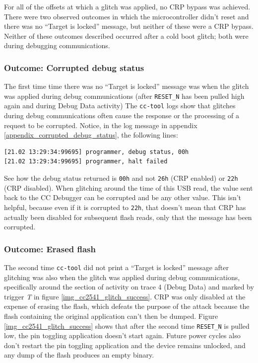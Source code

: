 For all of the offsets at which a glitch was applied, no CRP bypass was
achieved. There were two observed outcomes in which the microcontroller
didn't reset and there was no ``Target is locked'' message, but neither
of these were a CRP bypass. Neither of these outcomes described occurred
after a cold boot glitch; both were during debugging communications.

\hypertarget{outcome-corrupted-debug-status}{%
\subsubsection{Outcome: Corrupted debug
status}\label{outcome-corrupted-debug-status}}

The first time time there was no ``Target is locked'' message was when
the glitch was applied during debug communications (after
\texttt{RESET\_N} has been pulled high again and during Debug Data
activity) The \texttt{cc-tool} logs show that glitches during debug
communications often cause the response or the processing of a request
to be corrupted. Notice, in the log message in appendix
\ref{appendix_corrupted_debug_status}, the following lines:

\begin{verbatim}
[21.02 13:29:34:99695] programmer, debug status, 00h
[21.02 13:29:34:99695] programmer, halt failed
\end{verbatim}

See how the debug status returned is \texttt{00h} and not \texttt{26h}
(CRP enabled) or \texttt{22h} (CRP disabled). When glitching around the
time of this USB read, the value sent back to the CC Debugger can be
corrupted and be any other value. This isn't helpful, because even if it
is corrupted to \texttt{22h}, that doesn't mean that CRP has actually
been disabled for subsequent flash reads, only that the message has been
corrupted.

\hypertarget{outcome-erased-flash}{%
\subsubsection{Outcome: Erased flash}\label{outcome-erased-flash}}

The second time \texttt{cc-tool} did not print a ``Target is locked''
message after glitching was also when the glitch was applied during
debug communications, specifically around the section of activity on
trace 4 (Debug Data) and marked by trigger \emph{T} in figure
\ref{img_cc2541_glitch_success}. CRP was only disabled at the expense of
erasing the flash, which defeats the purpose of the attack because the
flash containing the original application can't then be dumped. Figure
\ref{img_cc2541_glitch_success} shows that after the second time
\texttt{RESET\_N} is pulled low, the pin toggling application doesn't
start again. Future power cycles also don't restart the pin toggling
application and the device remains unlocked, and any dump of the flash
produces an empty binary.

